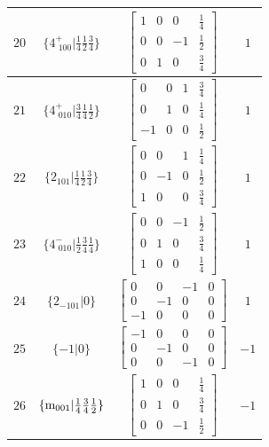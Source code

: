\documentclass[fleqn,8pt]{jsarticle}
\begin{document}
\begin{longtable}{cccc}
$ 20 $ & $ \{4^{+}_{\,\,100}|\frac{1}{4} \frac{1}{2} \frac{3}{4}\} $ & $ \begin{bmatrix} 1 & 0 & 0 & \frac{1}{4} \\ 0 & 0 & -1 & \frac{1}{2} \\ 0 & 1 & 0 & \frac{3}{4} \end{bmatrix} $ & $ 1 $ \\ \hline
$ 21 $ & $ \{4^{+}_{\,\,010}|\frac{3}{4} \frac{1}{4} \frac{1}{2}\} $ & $ \begin{bmatrix} 0 & 0 & 1 & \frac{3}{4} \\ 0 & 1 & 0 & \frac{1}{4} \\ -1 & 0 & 0 & \frac{1}{2} \end{bmatrix} $ & $ 1 $ \\ \hline
$ 22 $ & $ \{2{}_{101}|\frac{1}{4} \frac{1}{2} \frac{3}{4}\} $ & $ \begin{bmatrix} 0 & 0 & 1 & \frac{1}{4} \\ 0 & -1 & 0 & \frac{1}{2} \\ 1 & 0 & 0 & \frac{3}{4} \end{bmatrix} $ & $ 1 $ \\ \hline
$ 23 $ & $ \{4^{-}_{\,\,010}|\frac{1}{2} \frac{3}{4} \frac{1}{4}\} $ & $ \begin{bmatrix} 0 & 0 & -1 & \frac{1}{2} \\ 0 & 1 & 0 & \frac{3}{4} \\ 1 & 0 & 0 & \frac{1}{4} \end{bmatrix} $ & $ 1 $ \\ \hline
$ 24 $ & $ \{2{}_{-101}|0\} $ & $ \begin{bmatrix} 0 & 0 & -1 & 0 \\ 0 & -1 & 0 & 0 \\ -1 & 0 & 0 & 0 \end{bmatrix} $ & $ 1 $ \\ \hline
$ 25 $ & $ \{-1|0\} $ & $ \begin{bmatrix} -1 & 0 & 0 & 0 \\ 0 & -1 & 0 & 0 \\ 0 & 0 & -1 & 0 \end{bmatrix} $ & $ -1 $ \\ \hline
$ 26 $ & $ \{{\rm m}_{001}|\frac{1}{4} \frac{3}{4} \frac{1}{2}\} $ & $ \begin{bmatrix} 1 & 0 & 0 & \frac{1}{4} \\ 0 & 1 & 0 & \frac{3}{4} \\ 0 & 0 & -1 & \frac{1}{2} \end{bmatrix} $ & $ -1 $ \\ \hline

\end{longtable}
\end{document}
